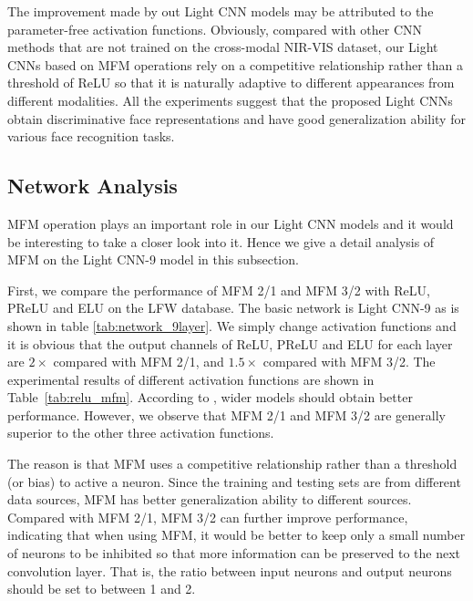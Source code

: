 \documentclass[journal,transmag]{IEEEtran}
\begin{document}
The improvement made by out Light CNN models may be attributed to the parameter-free activation functions.
Obviously, compared with other CNN methods that are not trained on the cross-modal NIR-VIS dataset, our Light CNNs based on MFM operations rely on a competitive relationship rather than a threshold of ReLU so that it is naturally adaptive to different appearances from different modalities.
All the experiments suggest that the proposed Light CNNs obtain discriminative face representations and have good generalization ability for various face recognition tasks.


\subsection{Network Analysis}

MFM operation plays an important role in our Light CNN models and it would be interesting to take a closer look into it. Hence we give a detail analysis of MFM on the Light CNN-9 model in this subsection.

First, we compare the performance of MFM 2/1 and MFM 3/2 with ReLU, PReLU and ELU on the LFW database. The basic network is Light CNN-9 as is shown in table \ref{tab:network_9layer}. We simply change activation functions and it is obvious that the output channels of ReLU, PReLU and ELU for each layer are $2\times$ compared with MFM 2/1, and $1.5\times$ compared with MFM 3/2. The experimental results of different activation functions are shown in Table~\ref{tab:relu_mfm}. According to \cite{DBLP:conf/bmvc/ZagoruykoK16}, wider models should obtain better performance. However, we observe that MFM 2/1 and MFM 3/2 are generally superior to the other three activation functions.

The reason is that MFM uses a competitive relationship rather than a threshold (or bias) to active a neuron. Since the training and testing sets are from different data sources, MFM has better generalization ability to different sources. Compared with MFM 2/1, MFM 3/2 can further improve performance, indicating that when using MFM, it would be better to keep only a small number of neurons to be inhibited so that more information can be preserved to the next convolution layer. That is, the ratio between input neurons and output neurons should be set to between 1 and 2.
\end{document}

